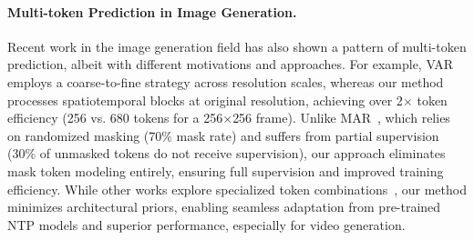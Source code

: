 \paragraph{Multi-token Prediction in Image Generation.}
Recent work in the image generation field has also shown a pattern of multi-token prediction, albeit with different motivations and approaches. 
For example, VAR~\citep{Tian2024VisualAM} employs a coarse-to-fine strategy across resolution scales, whereas our method processes spatiotemporal blocks at original resolution, achieving over 2$\times$ token efficiency (256 vs. 680 tokens for a 256$\times$256 frame). 
Unlike MAR~\citep{Li2024AutoregressiveIG}, which relies on randomized masking (70\% mask rate) and suffers from partial supervision (30\% of unmasked tokens do not receive supervision), our approach eliminates mask token modeling entirely, ensuring full supervision and improved training efficiency. 
While other works explore specialized token combinations~\citep{li2023lformer,wang2024parallelized}, our method minimizes architectural priors, enabling seamless adaptation from pre-trained NTP models and superior performance, especially for video generation.